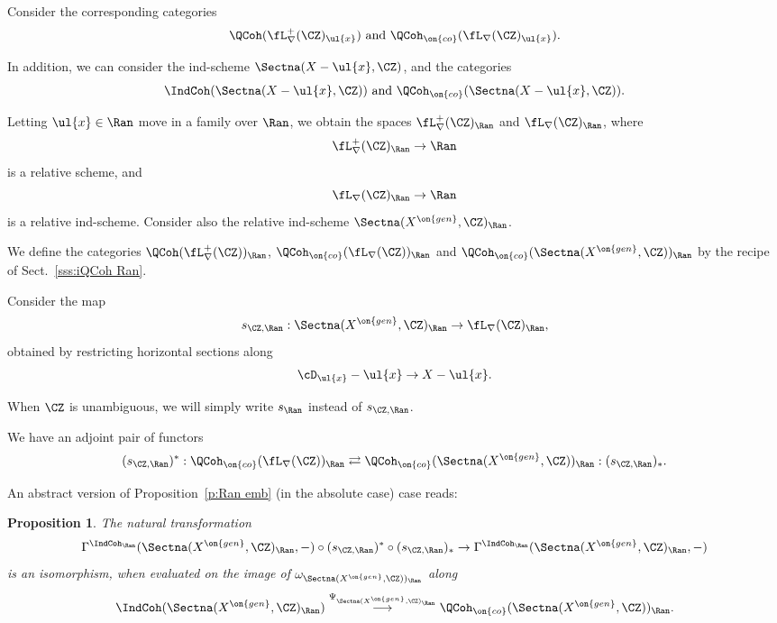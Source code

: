 \documentclass[9pt]{amsart}
\newtheorem{prop}[subsubsection]{Proposition}
\theoremstyle{remark}
\theoremstyle{definition}
\theoremstyle{remark}
\newcommand{\secref}[1]{Sect.~\ref{#1}}
\newcommand{\propref}[1]{Proposition~\ref{#1}}
\numberwithin{equation}{section}
\begin{document}
Consider the corresponding categories
$$\QCoh(\fL^+_\nabla(\CZ)_{\ul{x}}) \text{ and } \QCoh_{\on{co}}(\fL_\nabla(\CZ)_{\ul{x}}).$$

\medskip

In addition, we can consider the ind-scheme $\Sectna(X-\ul{x},\CZ)$, and the categories
$$\IndCoh(\Sectna(X-\ul{x},\CZ)) \text{ and } \QCoh_{\on{co}}(\Sectna(X-\ul{x},\CZ)).$$


\sssec{} 

Letting $\ul{x}\in \Ran$ move in a family over $\Ran$, we obtain the spaces $\fL^+_\nabla(\CZ)_\Ran$ and $\fL_\nabla(\CZ)_\Ran$, where 
$$\fL^+_\nabla(\CZ)_\Ran\to \Ran$$
is a relative scheme, and 
$$\fL_\nabla(\CZ)_\Ran\to \Ran$$
is a relative ind-scheme. Consider also the relative ind-scheme 
$\Sectna(X^{\on{gen}},\CZ)_\Ran$. 

\medskip

We define the categories $\QCoh(\fL^+_\nabla(\CZ))_\Ran$, $\QCoh_{\on{co}}(\fL_\nabla(\CZ))_\Ran$ and $\QCoh_{\on{co}}(\Sectna(X^{\on{gen}},\CZ))_\Ran$
by the recipe of \secref{sss:iQCoh Ran}. 

\sssec{}

Consider the map
$$s_{\CZ,\Ran}:\Sectna(X^{\on{gen}},\CZ)_\Ran\to \fL_\nabla(\CZ)_\Ran,$$
obtained by restricting horizontal sections along
$$\cD_{\ul{x}}-\ul{x}\to X-\ul{x}.$$

\medskip

When $\CZ$ is unambiguous, we will simply write $s_\Ran$ instead of $s_{\CZ,\Ran}$. 

\medskip

We have an adjoint pair of functors
$$(s_{\CZ,\Ran})^*:\QCoh_{\on{co}}(\fL_\nabla(\CZ))_\Ran\rightleftarrows {}\QCoh_{\on{co}}(\Sectna(X^{\on{gen}},\CZ))_\Ran:(s_{\CZ,\Ran})_*.$$

%
%
%

\sssec{}

An abstract version of \propref{p:Ran emb} (in the absolute case) case reads:

\begin{prop} \label{p:Ran emb abs abs}
The natural transformation
$$\Gamma^{\IndCoh_\Ran}(\Sectna(X^{\on{gen}},\CZ)_\Ran,-)\circ 
(s_{\CZ,\Ran})^*\circ (s_{\CZ,\Ran})_*\to \Gamma^{\IndCoh_\Ran}(\Sectna(X^{\on{gen}},\CZ)_\Ran,-)$$
is an isomorphism, when evaluated on the image of $\omega_{\Sectna(X^{\on{gen}},\CZ))_\Ran}$ along
$$\IndCoh(\Sectna(X^{\on{gen}},\CZ)_\Ran)\overset{\Psi_{\Sectna(X^{\on{gen}},\CZ)_\Ran}}\longrightarrow \QCoh_{\on{co}}(\Sectna(X^{\on{gen}},\CZ))_\Ran.$$
\end{prop}
\end{document}
